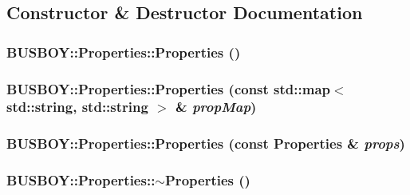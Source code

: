 \subsection{Constructor \& Destructor Documentation}
\hypertarget{classBUSBOY_1_1Properties_a4b844e15332fb8a8089aa1d217ce791d}{
\subsubsection[{Properties}]{\setlength{\rightskip}{0pt plus 5cm}BUSBOY::Properties::Properties ()}}
\label{classBUSBOY_1_1Properties_a4b844e15332fb8a8089aa1d217ce791d}
\hypertarget{classBUSBOY_1_1Properties_ab6d9fc1bbffa23b1b4e468b322102d24}{
\subsubsection[{Properties}]{\setlength{\rightskip}{0pt plus 5cm}BUSBOY::Properties::Properties (const std::map$<$ std::string, std::string $>$ \& {\em propMap})}}
\label{classBUSBOY_1_1Properties_ab6d9fc1bbffa23b1b4e468b322102d24}
\hypertarget{classBUSBOY_1_1Properties_a2d5de87f615fed59f1bbcb8e738a22bb}{
\subsubsection[{Properties}]{\setlength{\rightskip}{0pt plus 5cm}BUSBOY::Properties::Properties (const {\bf Properties} \& {\em props})}}
\label{classBUSBOY_1_1Properties_a2d5de87f615fed59f1bbcb8e738a22bb}
\hypertarget{classBUSBOY_1_1Properties_a041ebc66c0d7fc30cc9464b70826b94e}{
\subsubsection[{$\sim$Properties}]{\setlength{\rightskip}{0pt plus 5cm}BUSBOY::Properties::$\sim$Properties ()}}
\label{classBUSBOY_1_1Properties_a041ebc66c0d7fc30cc9464b70826b94e}


